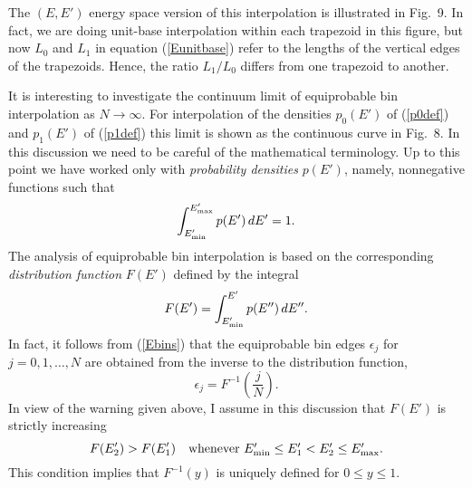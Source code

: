 \documentclass[11pt]{article}
\begin{document}
\begin{figure}

\end{figure}

\begin{figure}

\end{figure}

\begin{figure}

\end{figure}

The $(E, E')$ energy space version of this interpolation is
illustrated in Fig.~9.  In fact, we are doing unit-base
interpolation within each trapezoid in this figure, but
now $L_0$ and $L_1$ in equation (\ref{Eunitbase})
refer to the lengths of the vertical edges of the trapezoids.
Hence, the ratio $L_1/L_0$ differs
from one trapezoid to another.

\begin{figure}

\end{figure}

It is interesting to investigate the continuum limit of
equiprobable bin interpolation as $N \to \infty$.  For interpolation
of the
densities $p_0(E')$ of (\ref{p0def}) and $p_1(E')$ of (\ref{p1def})
this limit is shown as the continuous curve in Fig.~8.  In this
discussion we need to be careful of the mathematical terminology.
Up to this point we have worked only with {\em probability densities}
$p(E')$, namely, nonnegative functions such that
\[
  \int_{E'_{\rm min}}^{E'_{\rm max}} p(E') \, dE' = 1.
\]
The analysis of equiprobable bin interpolation is based on the
corresponding {\em distribution function} $F(E')$ defined by
the integral
\[
  F(E') = \int_{E'_{\rm min}}^{E'} p(E'') \, dE''.
\]
In fact, it follows from (\ref{Ebins}) that the equiprobable bin 
edges $\epsilon_j$ for $j = 0, 1, \ldots, N$ are obtained from 
the inverse to the distribution 
function,
\[
  \epsilon_j = F^{-1}\left(
     \frac{j}{N}
   \right).
\]
In view of the warning given above, I assume in this discussion
that $F(E')$ is strictly increasing
\begin{equation}
  F(E'_2) > F(E'_1) \quad
    \hbox{whenever $E'_{\rm min} \le E'_1 < E'_2 \le E'_{\rm max}$}.
  \label{onetoone}
\end{equation}
This condition implies that $F^{-1}(y)$ is uniquely defined for
$0 \le y \le 1$.
\end{document}
